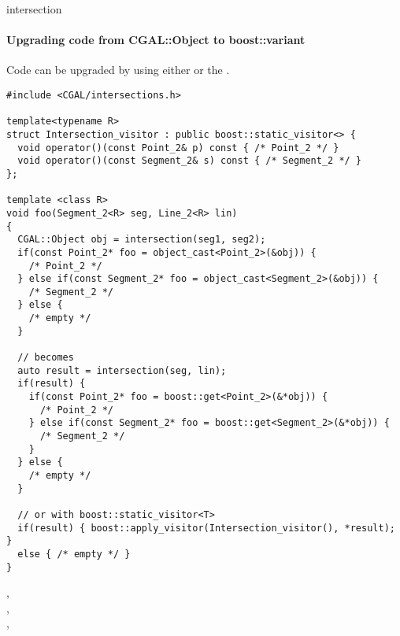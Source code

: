 \begin{ccRefFunction}{intersection}
\paragraph{Upgrading code from CGAL::Object to boost::variant}

Code can be upgraded by using either  or the
.

\ccHtmlLinksOff%
\begin{verbatim}
#include <CGAL/intersections.h>

template<typename R>
struct Intersection_visitor : public boost::static_visitor<> {
  void operator()(const Point_2& p) const { /* Point_2 */ }
  void operator()(const Segment_2& s) const { /* Segment_2 */ }
};

template <class R>
void foo(Segment_2<R> seg, Line_2<R> lin)
{
  CGAL::Object obj = intersection(seg1, seg2);
  if(const Point_2* foo = object_cast<Point_2>(&obj)) {
    /* Point_2 */
  } else if(const Segment_2* foo = object_cast<Segment_2>(&obj)) {
    /* Segment_2 */
  } else {
    /* empty */
  }

  // becomes
  auto result = intersection(seg, lin);
  if(result) {
    if(const Point_2* foo = boost::get<Point_2>(&*obj)) {
      /* Point_2 */
    } else if(const Segment_2* foo = boost::get<Segment_2>(&*obj)) {
      /* Segment_2 */
    }
  } else {
    /* empty */
  }

  // or with boost::static_visitor<T>
  if(result) { boost::apply_visitor(Intersection_visitor(), *result); } 
  else { /* empty */ }
}
\end{verbatim}%
\ccHtmlLinksOn%

\ccSeeAlso
{}, \\
, \\
, \\

\end{ccRefFunction}
